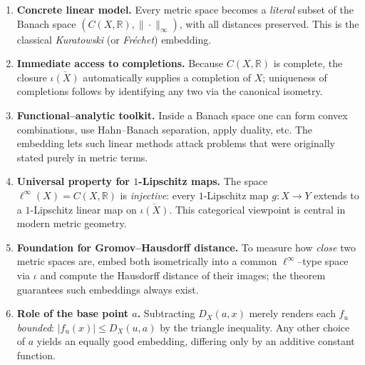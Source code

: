 \documentclass[12pt]{article}
\theoremstyle{definition} %
\theoremstyle{plain} %
\begin{document}
  \begin{enumerate}
    \item \textbf{Concrete linear model.}
          Every metric space becomes a \emph{literal} subset of the Banach
          space \((C(X,\mathbb R),\|\cdot\|_\infty)\), with all distances
          preserved.
          This is the classical \emph{Kuratowski} (or \emph{Fréchet})
          embedding.
  
    \item \textbf{Immediate access to completions.}
          Because \(C(X,\mathbb R)\) is complete, the closure
          \(\overline{\iota(X)}\) automatically supplies a completion of
          \(X\); uniqueness of completions follows by identifying any two
          via the canonical isometry.
  
    \item \textbf{Functional–analytic toolkit.}
          Inside a Banach space one can form convex combinations, use
          Hahn–Banach separation, apply duality, etc.
          The embedding lets such linear methods attack problems that were
          originally stated purely in metric terms.
  
    \item \textbf{Universal property for \(1\)-Lipschitz maps.}
          The space \(\ell^\infty(X)=C(X,\mathbb R)\) is
          \emph{injective}: every \(1\)-Lipschitz map
          \(g:X\to Y\) extends to a \(1\)-Lipschitz linear map
          on \(\overline{\iota(X)}\).
          This categorical viewpoint is central in modern metric geometry.
  
    \item \textbf{Foundation for Gromov–Hausdorff distance.}
          To measure how \emph{close} two metric spaces are, embed both
          isometrically into a common \(\ell^\infty\)–type space via
          \(\iota\) and compute the Hausdorff distance of their images;
          the theorem guarantees such embeddings always exist.
  
    \item \textbf{Role of the base point \(a\).}
          Subtracting \(D_X(a,x)\) merely renders each \(f_u\) \emph{bounded}:
          \(|f_u(x)|\le D_X(u,a)\) by the triangle inequality.
          Any other choice of \(a\) yields an equally good embedding,
          differing only by an additive constant function.
  \end{enumerate}
  
\end{document}
